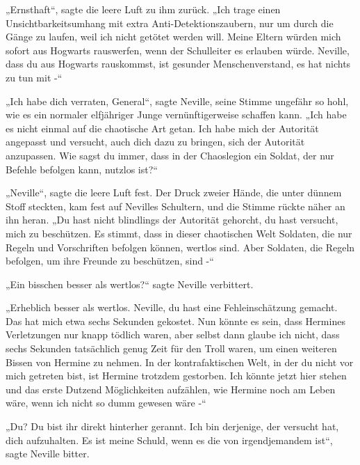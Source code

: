 {„Ernsthaft“, sagte die leere Luft zu ihm zurück. „Ich trage einen Unsichtbarkeitsumhang mit extra Anti-Detektionszaubern, nur um durch die Gänge zu laufen, weil ich nicht getötet werden will. Meine Eltern würden mich sofort aus Hogwarts rauswerfen, wenn der Schulleiter es erlauben würde. Neville, dass du aus Hogwarts rauskommst, ist gesunder Menschenverstand, es hat nichts zu tun mit -“

„Ich habe dich verraten, General“, sagte Neville, seine Stimme ungefähr so hohl, wie es ein normaler elfjähriger Junge vernünftigerweise schaffen kann. „Ich habe es nicht einmal auf die chaotische Art getan. Ich habe mich der Autorität angepasst und versucht, auch dich dazu zu bringen, sich der Autorität anzupassen. Wie sagst du immer, dass in der Chaoslegion ein Soldat, der nur Befehle befolgen kann, nutzlos ist?“

„Neville“, sagte die leere Luft fest. Der Druck zweier Hände, die unter dünnem Stoff steckten, kam fest auf Nevilles Schultern, und die Stimme rückte näher an ihn heran. „Du hast nicht blindlings der Autorität gehorcht, du hast versucht, mich zu beschützen. Es stimmt, dass in dieser chaotischen Welt Soldaten, die nur Regeln und Vorschriften befolgen können, wertlos sind. Aber Soldaten, die Regeln befolgen, um ihre Freunde zu beschützen, sind -“

„Ein bisschen besser als wertlos?“ sagte Neville verbittert.

„Erheblich besser als wertlos. Neville, du hast eine Fehleinschätzung gemacht. Das hat mich etwa sechs Sekunden gekostet. Nun könnte es sein, dass Hermines Verletzungen nur knapp tödlich waren, aber selbst dann glaube ich nicht, dass sechs Sekunden tatsächlich genug Zeit für den Troll waren, um einen weiteren Bissen von Hermine zu nehmen. In der kontrafaktischen Welt, in der du nicht vor mich getreten bist, ist Hermine trotzdem gestorben. Ich könnte jetzt hier stehen und das erste Dutzend Möglichkeiten aufzählen, wie Hermine noch am Leben wäre, wenn ich nicht so dumm gewesen wäre -“

„Du? Du bist ihr direkt hinterher gerannt. Ich bin derjenige, der versucht hat, dich aufzuhalten. Es ist meine Schuld, wenn es die von irgendjemandem ist“, sagte Neville bitter.

}

